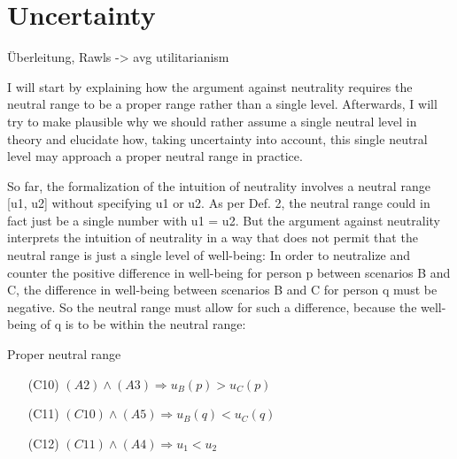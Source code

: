 \section{Uncertainty}
\label{sec:obj2}

Überleitung, Rawls -{\textgreater} avg utilitarianism 

I will start by explaining how the argument against neutrality requires the neutral range to be a proper range rather than a single level. Afterwards, I will try to make plausible why we should rather assume a single neutral level in theory and elucidate how, taking uncertainty into account, this single neutral level may approach a proper neutral range in practice.  

So far, the formalization of the intuition of neutrality involves a neutral range [u1, u2] without specifying u1 or u2. As per Def. 2, the neutral range could in fact just be a single number with u1 = u2. But the argument against neutrality interprets the intuition of neutrality in a way that does not permit that the neutral range is just a single level of well-being: In order to neutralize and counter the positive difference in well-being for person p between scenarios B and C, the difference in well-being between scenarios B and C for person q must be negative. So the neutral range must allow for such a difference, because the well-being of q is to be within the neutral range:

\begin{Corollary}{Proper neutral range}{}
\begin{enumerate}
\item[(C10)] $(A2)  \wedge (A3) \Rightarrow u_B(p) > u_C(p)$
\item[(C11)] $(C10) \wedge (A5) \Rightarrow u_B(q) < u_C(q)$
\item[(C12)] $(C11) \wedge (A4) \Rightarrow u_1 < u_2$
\end{enumerate}
\end{Corollary}

